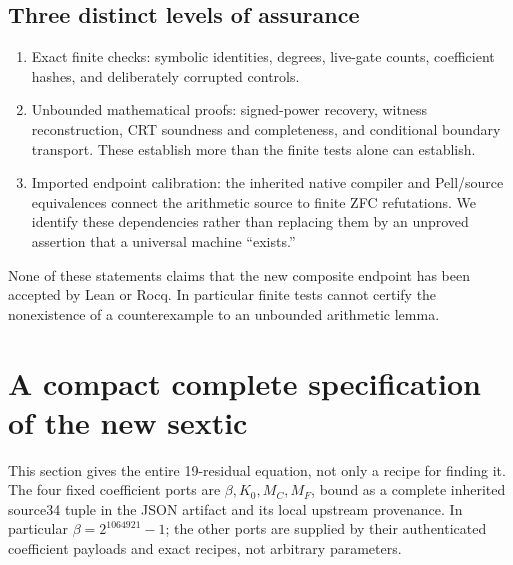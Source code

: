 \documentclass[11pt]{article}
\begin{document}
\subsection{Three distinct levels of assurance}
\begin{enumerate}
\item Exact finite checks: symbolic identities, degrees, live-gate counts,
coefficient hashes, and deliberately corrupted controls.
\item Unbounded mathematical proofs: signed-power recovery, witness
reconstruction, CRT soundness and completeness, and conditional boundary
transport. These establish more than the finite tests alone can establish.
\item Imported endpoint calibration: the inherited native compiler and
Pell/source equivalences connect the arithmetic source to finite ZFC
refutations. We identify these dependencies rather than replacing them by
an unproved assertion that a universal machine ``exists.''
\end{enumerate}
None of these statements claims that the new composite endpoint has been
accepted by Lean or Rocq. In particular finite tests cannot certify the
nonexistence of a counterexample to an unbounded arithmetic lemma.


\section{A compact complete specification of the new sextic}
This section gives the entire 19-residual equation, not only a recipe for
finding it. The four fixed coefficient ports are
$\beta,K_0,M_C,M_F$, bound as a complete inherited source34 tuple in the
JSON artifact and its local upstream provenance. In particular
$\beta=2^{1064921}-1$; the other ports are supplied by their authenticated
coefficient payloads and exact recipes, not arbitrary parameters.
\end{document}
